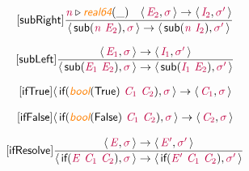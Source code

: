 \documentclass[10pt,leqno,fleqn]{article}
\newcommand{\artVariable}[1]{\mbox{\color{purple}\em #1\/}}
\newcommand{\artConstructor}[1]{\mbox{\sf #1}}
\newcommand{\artSpecial}[1]{\mbox{\color{orange}\sf\em #1}}
\begin{document}
\begin{equation}
\tag*{[\artConstructor{\sf subRight}]}
\begin{split}\frac{ \artVariable{n}\triangleright \artSpecial{real64}(\_) \quad \langle\, \artVariable{E$_{2}$}, \artVariable{$\sigma$}\,\rangle \rightarrow \langle\, \artVariable{I$_{2}$}, \artVariable{$\sigma$\/$^\prime$}\,\rangle }{\langle\, \artConstructor{\sf sub}(\artVariable{n}\ \artVariable{E$_{2}$}), \artVariable{$\sigma$}\,\rangle \rightarrow \langle\, \artConstructor{\sf sub}(\artVariable{n}\ \artVariable{I$_{2}$}), \artVariable{$\sigma$\/$^\prime$}\,\rangle }
\end{split}
\end{equation}

\begin{equation}
\tag*{[\artConstructor{\sf subLeft}]}
\begin{split}\frac{\langle\, \artVariable{E$_{1}$}, \artVariable{$\sigma$}\,\rangle \rightarrow \langle\, \artVariable{I$_{1}$}, \artVariable{$\sigma$\/$^\prime$}\,\rangle }{\langle\, \artConstructor{\sf sub}(\artVariable{E$_{1}$}\ \artVariable{E$_{2}$}), \artVariable{$\sigma$}\,\rangle \rightarrow \langle\, \artConstructor{\sf sub}(\artVariable{I$_{1}$}\ \artVariable{E$_{2}$}), \artVariable{$\sigma$\/$^\prime$}\,\rangle }
\end{split}
\end{equation}

\begin{equation}
\tag*{[\artConstructor{\sf ifTrue}]}
\begin{split}\langle\, \artConstructor{\sf if}(\artSpecial{bool}(\artConstructor{\sf True})\ \artVariable{C$_{1}$}\ \artVariable{C$_{2}$}), \artVariable{$\sigma$}\,\rangle \rightarrow \langle\, \artVariable{C$_{1}$}, \artVariable{$\sigma$}\,\rangle 
\end{split}
\end{equation}

\begin{equation}
\tag*{[\artConstructor{\sf ifFalse}]}
\begin{split}\langle\, \artConstructor{\sf if}(\artSpecial{bool}(\artConstructor{\sf False})\ \artVariable{C$_{1}$}\ \artVariable{C$_{2}$}), \artVariable{$\sigma$}\,\rangle \rightarrow \langle\, \artVariable{C$_{2}$}, \artVariable{$\sigma$}\,\rangle 
\end{split}
\end{equation}

\begin{equation}
\tag*{[\artConstructor{\sf ifResolve}]}
\begin{split}\frac{\langle\, \artVariable{E}, \artVariable{$\sigma$}\,\rangle \rightarrow \langle\, \artVariable{E\/$^\prime$}, \artVariable{$\sigma$\/$^\prime$}\,\rangle }{\langle\, \artConstructor{\sf if}(\artVariable{E}\ \artVariable{C$_{1}$}\ \artVariable{C$_{2}$}), \artVariable{$\sigma$}\,\rangle \rightarrow \langle\, \artConstructor{\sf if}(\artVariable{E\/$^\prime$}\ \artVariable{C$_{1}$}\ \artVariable{C$_{2}$}), \artVariable{$\sigma$\/$^\prime$}\,\rangle }
\end{split}
\end{equation}
\end{document}
